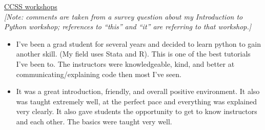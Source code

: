 \documentclass[12pt,letterpaper]{article}
\begin{document}
\noindent\underline{CCSS workshops}\\
\emph{[Note: comments are taken from a survey question about my Introduction to Python workshop; references to ``this'' and ``it'' are referring to that workshop.]}
\begin{itemize}
    \item I've been a grad student for several years and decided to learn python to gain another skill. (My field uses Stata and R). This is one of the best tutorials I've been to. The instructors were knowledgeable, kind, and better at communicating/explaining code then most I've seen. 
    \item It was a great introduction, friendly, and overall positive environment. It also was taught extremely well, at the perfect pace and everything was explained very clearly. It also gave students the opportunity to get to know instructors and each other. The basics were taught very well.
\end{itemize}

\else
%
\fi
\end{document}
